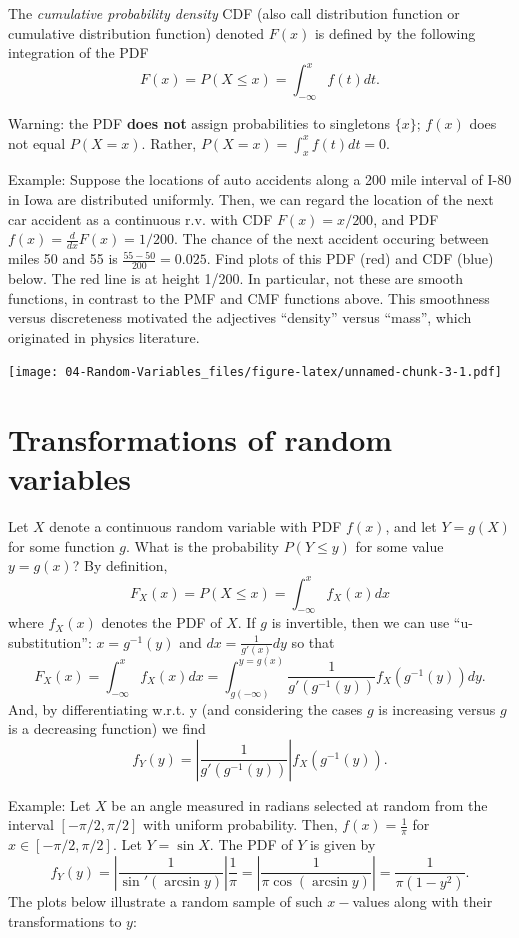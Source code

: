 \documentclass[
]{book}
\begin{document}
The \emph{cumulative probability density} CDF (also call distribution function or cumulative distribution function) denoted \(F(x)\) is defined by the following integration of the PDF
\[F(x) = P(X\leq x) = \int_{-\infty}^x f(t)dt.\]

Warning: the PDF \textbf{does not} assign probabilities to singletons \(\{x\}\); \(f(x)\) does not equal \(P(X=x)\). Rather, \(P(X=x) = \int_x^x f(t)dt = 0\).

Example: Suppose the locations of auto accidents along a 200 mile interval of I-80 in Iowa are distributed uniformly. Then, we can regard the location of the next car accident as a continuous r.v. with CDF \(F(x) = x/200\), and PDF \(f(x) = \frac{d}{dx}F(x) = 1/200\). The chance of the next accident occuring between miles 50 and 55 is \(\frac{55-50}{200} = 0.025\). Find plots of this PDF (red) and CDF (blue) below. The red line is at height 1/200. In particular, not these are smooth functions, in contrast to the PMF and CMF functions above. This smoothness versus discreteness motivated the adjectives ``density'' versus ``mass'', which originated in physics literature.

\texttt{[image: 04-Random-Variables\_files/figure-latex/unnamed-chunk-3-1.pdf]}

\hypertarget{transformations-of-random-variables}{%
\section{Transformations of random variables}\label{transformations-of-random-variables}}

Let \(X\) denote a continuous random variable with PDF \(f(x)\), and let \(Y = g(X)\) for some function \(g\). What is the probability \(P(Y \leq y)\) for some value \(y = g(x)\)? By definition,
\[F_X(x) = P(X\leq x) = \int_{-\infty}^x f_X(x)dx\]
where \(f_X(x)\) denotes the PDF of \(X\). If \(g\) is invertible, then we can use ``u-substitution'': \(x = g^{-1}(y)\) and \(dx = \frac{1}{g'(x)}dy\) so that
\[F_X(x) = \int_{-\infty}^x f_X(x)dx = \int_{g(-\infty)}^{y=g(x)} \frac{1}{g'(g^{-1}(y))} f_X(g^{-1}(y))dy.\]
And, by differentiating w.r.t. y (and considering the cases \(g\) is increasing versus \(g\) is a decreasing function) we find
\[f_Y(y) = \left|\frac{1}{g'(g^{-1}(y))}\right| f_X(g^{-1}(y)).\]

Example: Let \(X\) be an angle measured in radians selected at random from the interval \([-\pi/2, \pi/2]\) with uniform probability. Then, \(f(x) = \frac{1}{\pi}\) for \(x \in [-\pi/2, \pi/2]\). Let \(Y = \sin X\). The PDF of \(Y\) is given by
\[f_Y(y) = \left|\frac{1}{\sin'(\arcsin y)}\right|\frac{1}{\pi} = \left|\frac{1}{\pi\cos(\arcsin y)}\right| = \frac{1}{\pi(1-y^2)}.\]
The plots below illustrate a random sample of such \(x-\)values along with their transformations to \(y\):
\end{document}
